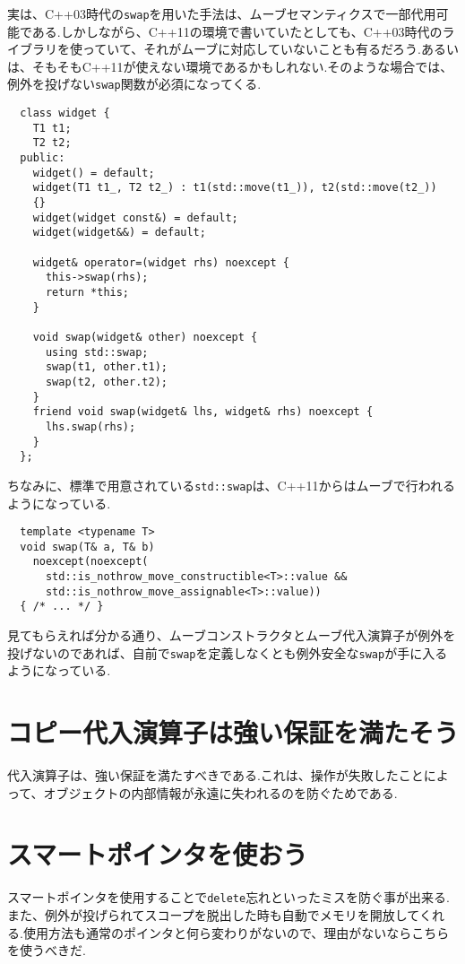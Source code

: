 \documentclass[a4j,11pt,openright]{jsbook}
\begin{document}
実は、C++03時代の\verb|swap|を用いた手法は、ムーブセマンティクスで一部代用可能である.しかしながら、C++11の環境で書いていたとしても、C++03時代のライブラリを使っていて、それがムーブに対応していないことも有るだろう.あるいは、そもそもC++11が使えない環境であるかもしれない.そのような場合では、例外を投げない\verb|swap|関数が必須になってくる.

\begin{verbatim}
  class widget {
    T1 t1;
    T2 t2;
  public:
    widget() = default;
    widget(T1 t1_, T2 t2_) : t1(std::move(t1_)), t2(std::move(t2_))
    {}
    widget(widget const&) = default;
    widget(widget&&) = default;

    widget& operator=(widget rhs) noexcept {
      this->swap(rhs);
      return *this;
    }

    void swap(widget& other) noexcept {
      using std::swap;
      swap(t1, other.t1);
      swap(t2, other.t2);
    }
    friend void swap(widget& lhs, widget& rhs) noexcept {
      lhs.swap(rhs);
    }
  };

\end{verbatim}

ちなみに、標準で用意されている\verb|std::swap|は、C++11からはムーブで行われるようになっている.

\begin{verbatim}
  template <typename T>
  void swap(T& a, T& b)
    noexcept(noexcept(
      std::is_nothrow_move_constructible<T>::value &&
      std::is_nothrow_move_assignable<T>::value))
  { /* ... */ }
\end{verbatim}

見てもらえれば分かる通り、ムーブコンストラクタとムーブ代入演算子が例外を投げないのであれば、自前で\verb|swap|を定義しなくとも例外安全な\verb|swap|が手に入るようになっている.


\section{コピー代入演算子は強い保証を満たそう}

代入演算子は、強い保証を満たすべきである.これは、操作が失敗したことによって、オブジェクトの内部情報が永遠に失われるのを防ぐためである.

\section{スマートポインタを使おう}

スマートポインタを使用することで\verb|delete|忘れといったミスを防ぐ事が出来る.また、例外が投げられてスコープを脱出した時も自動でメモリを開放してくれる.使用方法も通常のポインタと何ら変わりがないので、理由がないならこちらを使うべきだ.
\end{document}
